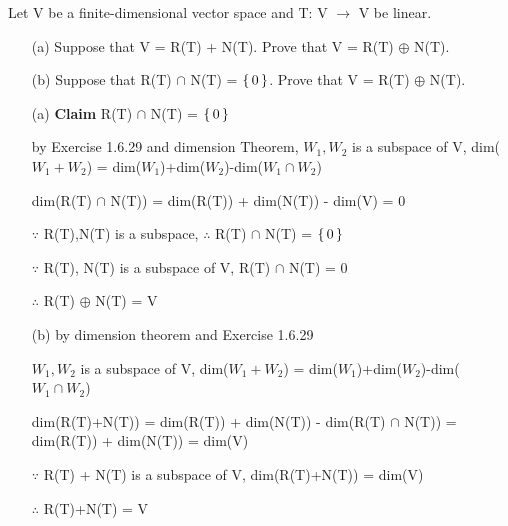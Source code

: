 Let V be a finite-dimensional vector space and T: V $\rightarrow$ V be linear.

\begin{enumerate}
	\item[(a)] Suppose that V = R(T) + N(T). Prove that V = R(T) $\oplus$ N(T).
	\item[(b)] Suppose that R(T) $\cap$ N(T) = $\left\{ \,0 \,\right\}$. Prove that V = R(T) $\oplus$ N(T).
\end{enumerate}

\begin{tcolorbox}
\begin{solution}
\begin{enumerate}
	\item[(a)] \textbf{Claim} R(T) $\cap$ N(T) = $\left\{ \,0 \,\right\}$
	
	by Exercise 1.6.29 and dimension Theorem, $W_1,W_2$ is a subspace of V, dim($W_1+W_2$) = dim($W_1$)+dim($W_2$)-dim($W_1 \cap W_2$)
	
	dim(R(T) $\cap$ N(T)) = dim(R(T)) + dim(N(T)) - dim(V) = $0$
	
	$\because$ R(T),N(T) is a subspace, $\therefore$ R(T) $\cap$ N(T) = $\left\{ \,0 \,\right\}$
	
	$\because$ R(T), N(T) is a subspace of V, R(T) $\cap$ N(T) = 0
	
	$\therefore$ R(T) $\oplus$ N(T) = V
	
	\item[(b)] by dimension theorem and Exercise 1.6.29
	
	$W_1,W_2$ is a subspace of V, dim($W_1+W_2$) = dim($W_1$)+dim($W_2$)-dim($W_1 \cap W_2$)
	
	dim(R(T)+N(T)) = dim(R(T)) + dim(N(T)) - dim(R(T) $\cap$ N(T)) = dim(R(T)) + dim(N(T)) = dim(V)
	
	$\because$ R(T) + N(T) is a subspace of V, dim(R(T)+N(T)) = dim(V)
	
	$\therefore$ R(T)+N(T) = V
\end{enumerate}		
\end{solution}

\end{tcolorbox}